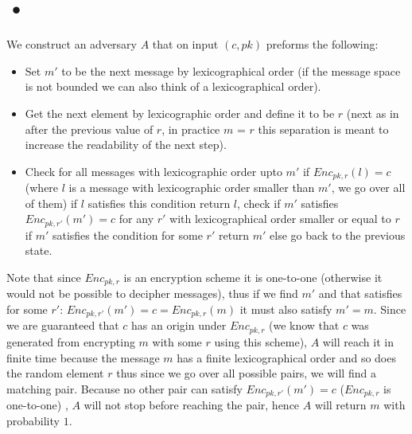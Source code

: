 \documentclass{article}
\begin{document}
\section{•}
We construct an adversary $A$ that on input $(c, pk)$ preforms the following:
\begin{itemize}
\item Set $m'$ to be the next message by lexicographical order (if the message space is not bounded we can also think of a lexicographical order).
\item Get the next element by lexicographic order and define it to be $r$ (next as in after the previous value of $r$, in practice $m$ = $r$ this separation is meant to increase the readability of the next step).
\item Check for all messages with lexicographic order upto $m'$ if $Enc_{pk, r}(l) = c$ (where $l$ is a message with lexicographic order smaller than $m'$, we go over all of them) if $l$ satisfies this condition return  $l$, check if $m'$ satisfies   $Enc_{pk, r'}(m') = c$ for any $r'$ with lexicographical order smaller or equal to $r$ if $m'$ satisfies the condition for some $r'$ return $m'$ else go back to the previous state.
\end{itemize}

Note that since $Enc_{pk,r}$ is an encryption scheme it is one-to-one (otherwise it would not be possible to decipher messages), thus if we find $m'$  and that satisfies for some $r'$: $Enc_{pk,r'}(m') = c = Enc_{pk,r}(m)$ it must also satisfy  $m' =m$. Since we are guaranteed that $c$ has an origin under $Enc_{pk, r}$ (we know that $c$ was generated from encrypting $m$ with some $r$ using this scheme), $A$ will reach it in finite time because the message $m$ has a finite lexicographical order and so does the random element $r$ thus since we go over all possible pairs, we will find a matching pair. Because no other pair can satisfy  $Enc_{pk, r'}(m') = c$  ($Enc_{pk, r}$ is one-to-one) , $A$ will not stop before reaching the pair, hence $A$ will return $m$ with probability $1$.
\end{document}
